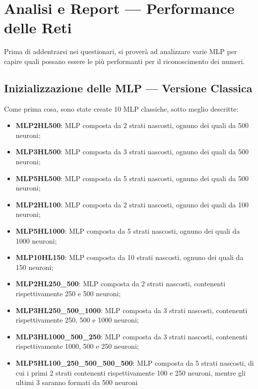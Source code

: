 \documentclass[12pt, a4paper]{article}
\begin{document}
\newpage
\section{Analisi e Report --- Performance delle Reti}
Prima di addentrarsi nei questionari, si proverà ad analizzare varie MLP per capire quali possano essere le più performanti per il riconoscimento dei numeri.\\
\subsection{Inizializzazione delle MLP --- Versione Classica}
Come prima cosa, sono state create 10 MLP classiche, sotto meglio descritte:
\begin{itemize}
    \item \textbf{MLP2HL500}: MLP composta da 2 strati nascosti, ognuno dei quali da 500 neuroni;
    \item \textbf{MLP3HL500}: MLP composta da 3 strati nascosti, ognuno dei quali da 500 neuroni;
    \item \textbf{MLP5HL500}: MLP composta da 5 strati nascosti, ognuno dei quali da 500 neuroni;
    \item \textbf{MLP2HL100}: MLP composta da 2 strati nascosti, ognuno dei quali da 100 neuroni;
    \item \textbf{MLP5HL1000}: MLP composta da 5 strati nascosti, ognuno dei quali da 1000 neuroni;
    \item \textbf{MLP10HL150}: MLP composta da 10 strati nascosti, ognuno dei quali da 150 neuroni; 
    \item \textbf{MLP2HL250\_500}: MLP composta da 2 strati nascosti, contenenti rispettivamente 250 e 500 neuroni; 
    \item \textbf{MLP3HL250\_500\_1000}: MLP composta da 3 strati nascosti, contenenti rispettivamente 250, 500 e 1000 neuroni; 
    \item \textbf{MLP3HL1000\_500\_250}: MLP composta da 3 strati nascosti, contenenti rispettivamente 1000, 500 e 250 neuroni; 
    \item \textbf{MLP5HL100\_250\_500\_500\_500}: MLP composta da 5 strati nascosti, di cui i primi 2 strati contenenti rispettivamente 100 e 250 neuroni, mentre gli ultimi 3 saranno formati da 500 neuroni 
\end{itemize}
\end{document}
